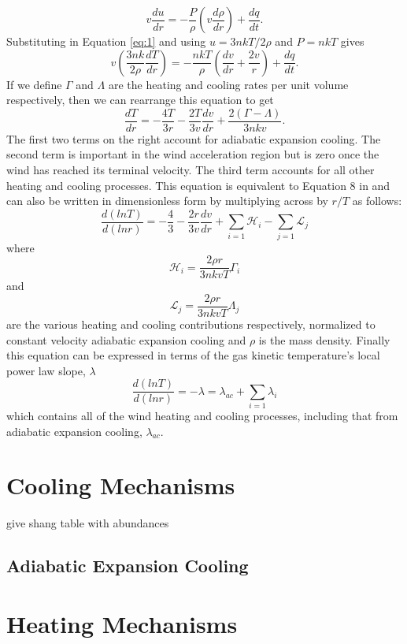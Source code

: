 \begin{equation}
v\frac{du}{dr}=-\frac{P}{\rho}\left(v\frac{d\rho}{dr} \right)+\frac{dq}{dt}.
\end{equation}
Substituting in Equation \ref{eq:1} and using $u=3nkT/2\rho$ and $P=nkT$ gives
\begin{equation}
v\left(\frac{3nk}{2\rho}\frac{dT}{dr}\right)=-\frac{nkT}{\rho}\left(\frac{dv}{dr} + \frac{2v}{r}\right) +\frac{dq}{dt}.
\end{equation}
If we define $\Gamma$ and $\Lambda$ are the heating and cooling rates per unit volume respectively, then we can rearrange this equation to get
\begin{equation}
\frac{dT}{dr}=-\frac{4T}{3r}-\frac{2T}{3v}\frac{dv}{dr}+\frac{2(\Gamma-\Lambda)}{3nkv}.
\end{equation}
The first two terms on the right account for adiabatic expansion cooling. The second term is important in the wind acceleration region but is zero once the wind has reached its terminal velocity. The third term accounts for all other heating and cooling processes. This equation is equivalent to Equation 8 in \cite{goldreich_1976} and can also be written in dimensionless form \citep{rodgers_1991} by multiplying across by $r/T$ as follows:
\begin{equation} 
\frac{d(lnT)}{d(lnr)}=-\frac{4}{3}-\frac{2r}{3v}\frac{dv}{dr}+\displaystyle\sum_{i=1}\mathcal{H}_{i}-\displaystyle\sum_{j=1}\mathcal{L}_{j}
\end{equation} 
where 
\begin{equation}
\mathcal{H}_{i}=\frac{2\rho r}{3nkvT}\Gamma_{i} 
\end{equation} 
and 
\begin{equation}
\mathcal{L}_{j}=\frac{2\rho r}{3nkvT}\Lambda_{j}
\end{equation} 
are the various heating and cooling contributions respectively, normalized to constant velocity adiabatic expansion cooling and $\rho$ is the mass density. Finally this equation can be expressed in terms of the gas kinetic temperature's local power law slope, $\lambda$
\begin{equation} \label{eq:lambda}
\frac{d(lnT)}{d(lnr)}=-\lambda=\lambda_{ac}+\displaystyle\sum_{i=1}\lambda_{i}
\end{equation} 
which contains all of the wind heating and cooling processes, including that from adiabatic expansion cooling, $\lambda_{ac}$.


\section{Cooling Mechanisms}\label{sec:3}
give shang table with abundances

\subsection{Adiabatic Expansion Cooling}\label{sec:3.1}

\section{Heating Mechanisms}\label{sec:3}

